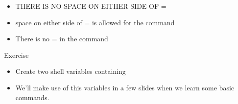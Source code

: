 \documentclass[10pt,t]{beamer}
\begin{document}
\begin{frame}
\begin{itemize}
\begin{center}
    \end{center}
    \item {} THERE IS NO SPACE ON EITHER SIDE OF =
    \item {} space on either side of = is allowed for the  command
    \item {} There is no = in the  command
  \end{itemize}
  \framebreak
  \begin{exampleblock}{Exercise}
    \begin{itemize}
      \item Create two shell variables containing
      \item We'll make use of this variables in a few slides when we learn some basic commands.
    \end{itemize}
  \end{exampleblock}
\end{frame}
\end{document}
